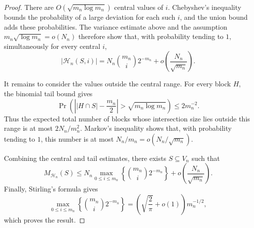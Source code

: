 \documentclass[10pt,a4paper]{amsart}
\begin{document}
\begin{proof}
		There are \(O(\sqrt{m_n\log m_n})\) central values of \(i\). Chebyshev's inequality bounds the probability of a large deviation for each such \(i\), and the union bound adds these probabilities. The variance estimate above and the assumption \(m_n\sqrt{\log m_n}=o(N_n)\) therefore show that, with probability tending to \(1\), simultaneously for every central \(i\),
		\[
		|\mathcal H_n(S,i)|
		=
		N_n\binom{m_n}{i}2^{-m_n}
		+o\left(\frac{N_n}{\sqrt{m_n}}\right).
		\]
		
		It remains to consider the values outside the central range. For every block \(H\), the binomial tail bound gives
		\[
		\Pr\left(
		\left||H\cap S|-\frac{m_n}{2}\right|
		>\sqrt{m_n\log m_n}
		\right)
		\leq 2m_n^{-2}.
		\]
		Thus the expected total number of blocks whose intersection size lies outside this range is at most \(2N_n/m_n^2\). Markov's inequality shows that, with probability tending to \(1\), this number is at most \(N_n/m_n=o(N_n/\sqrt{m_n})\).
		
		Combining the central and tail estimates, there exists \(S\subseteq V_n\) such that
		\[
		M_{\mathcal H_n}(S)
		\leq
		N_n\max_{0\leq i\leq m_n}
		\left\{\binom{m_n}{i}2^{-m_n}\right\}
		+o\left(\frac{N_n}{\sqrt{m_n}}\right).
		\]
		Finally, Stirling's formula gives
		\[
		\max_{0\leq i\leq m_n}
		\left\{\binom{m_n}{i}2^{-m_n}\right\}
		=
		\left(\sqrt{\frac{2}{\pi}}+o(1)\right)m_n^{-1/2},
		\]
		which proves the result.
	\end{proof}
\end{document}
